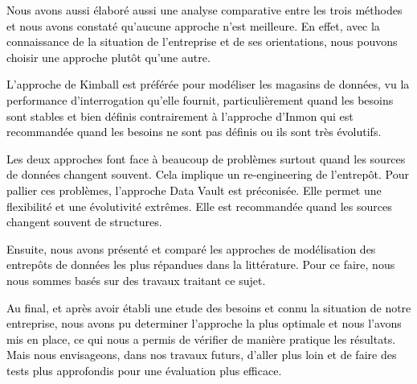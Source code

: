 \documentclass[a4paper,12pt]{report}
\begin{document}
\textcolor{black}{ Nous avons aussi élaboré aussi une analyse comparative entre les trois méthodes et nous avons constaté qu’aucune approche n’est meilleure. En effet, avec la connaissance de la situation de l’entreprise et de ses orientations, nous pouvons choisir une approche plutôt qu’une autre.}


\textcolor{black}{L’approche de Kimball est préférée pour modéliser les magasins de données, vu la performance d’interrogation qu’elle fournit, particulièrement quand les besoins sont stables et bien définis contrairement à l’approche d’Inmon qui est recommandée quand les besoins ne sont pas définis ou ils sont très évolutifs. }


\textcolor{black}{Les deux approches font face à beaucoup de problèmes surtout quand les sources de données changent souvent. Cela implique un re-engineering de l’entrepôt.
Pour pallier ces problèmes, l’approche Data Vault est préconisée. Elle permet une flexibilité et une évolutivité extrêmes. Elle est recommandée quand les sources changent souvent de structures. }

\textcolor{black}{
Ensuite, nous avons présenté et comparé les approches de modélisation des entrepôts de données les plus répandues dans la littérature. Pour ce faire, nous nous sommes basés sur des travaux traitant ce sujet.}

\textcolor{black}{Au final, et après avoir établi une etude des besoins et connu la situation de notre entreprise, nous avons pu determiner l'approche la plus optimale et nous l'avons mis en place, ce qui nous a permis de vérifier de manière pratique les résultats. Mais nous envisageons, dans nos travaux futurs, d'aller plus loin et de faire des tests plus approfondis pour une évaluation plus efficace.
}


\renewcommand{\bibname}{Bibliographie}
\fancyhead[LE,RO]{} \fancyhead[LO]{}\fancyhead[RE]{}
\renewcommand{\footrulewidth}{0.5pt}


\end{document}
